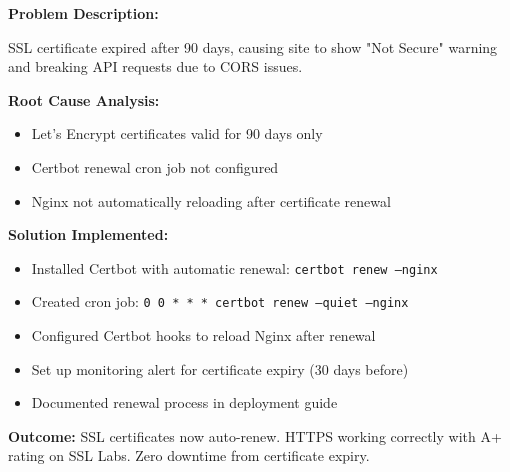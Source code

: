 \documentclass[12pt,a4paper]{article}
\begin{document}
\begin{tcolorbox}[colback=LightGold, colframe=Gold, title=\textbf{Challenge 9: Let's Encrypt SSL Certificate Auto-Renewal}, fonttitle=\bfseries]

\textbf{Problem Description:}

SSL certificate expired after 90 days, causing site to show "Not Secure" warning and breaking API requests due to CORS issues.

\textbf{Root Cause Analysis:}
\begin{itemize}[noitemsep]
  \item Let's Encrypt certificates valid for 90 days only
  \item Certbot renewal cron job not configured
  \item Nginx not automatically reloading after certificate renewal
\end{itemize}

\textbf{Solution Implemented:}
\begin{itemize}[noitemsep]
  \item Installed Certbot with automatic renewal: \texttt{certbot renew --nginx}
  \item Created cron job: \texttt{0 0 * * * certbot renew --quiet --nginx}
  \item Configured Certbot hooks to reload Nginx after renewal
  \item Set up monitoring alert for certificate expiry (30 days before)
  \item Documented renewal process in deployment guide
\end{itemize}

\textbf{Outcome:} SSL certificates now auto-renew. HTTPS working correctly with A+ rating on SSL Labs. Zero downtime from certificate expiry.
\end{tcolorbox}

\vspace{8pt}
\end{document}

